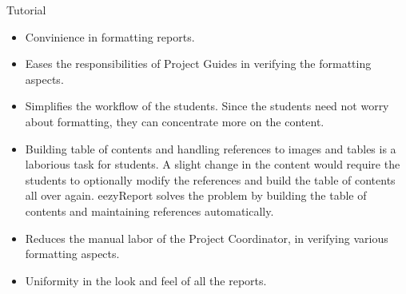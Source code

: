 \documentclass{report}
\begin{document}
\begin{projChapter}{Tutorial}
\begin{itemize}
  \item Convinience in formatting reports.
  \item Eases the responsibilities of Project Guides in verifying the formatting aspects.
  \item Simplifies the workflow of the students. Since the students need not worry about formatting, they can concentrate more on the content.
  \item Building table of contents and handling references to images and tables is a laborious task for students. A slight change in the content would require the students to optionally modify the references and build the table of contents all over again. eezyReport solves the problem by building the table of contents and maintaining references automatically.
  \item Reduces the manual labor of the Project Coordinator, in verifying various formatting aspects.
  \item Uniformity in the look and feel of all the reports.
\end{itemize}

\end{projChapter}
\end{document}
